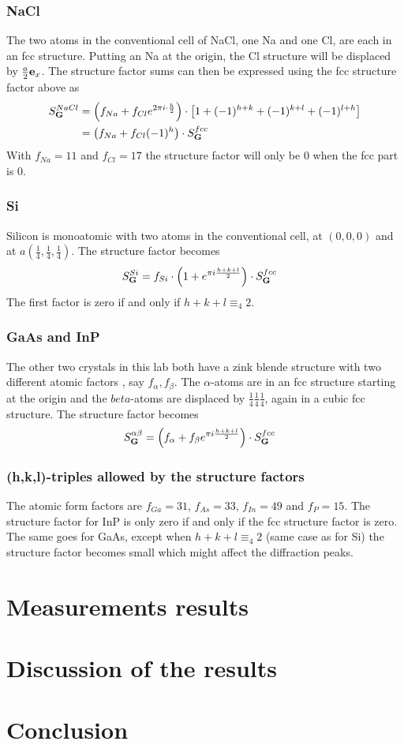 \documentclass[a4paper,twoside=false,abstract=false,numbers=noenddot,
titlepage=false,headings=small,parskip=half,version=last]{scrartcl}
\begin{document}
\subsubsection{NaCl}
The two atoms in the conventional cell of NaCl, one Na and one Cl, are each in an fcc structure. Putting an Na at the origin, the Cl structure will be displaced by $\frac{a}{2}\bold{e}_x$. The structure factor sums can then be expressed using the fcc structure factor above as
\begin{align}
S^{NaCl}_{\bold{G}} &= \left( f_{Na} + f_{Cl}e^{2\pi i\cdot \frac{h}{2}} \right) \cdot \left[ 1 + (-1)^{h+k} + (-1)^{k+l} + (-1)^{l+h}\right]\nonumber\\
&= \left( f_{Na} + f_{Cl}(-1)^{h} \right) \cdot S^{fcc}_{\bold{G}}
\end{align}\label{naclstructure}
With $f_{Na}=11$ and $f_{Cl}=17$ the structure factor will only be $0$ when the fcc part is $0$.
\subsubsection{Si}
Silicon is monoatomic with two atoms in the conventional cell, at $(0,0,0)$ and at $a(\frac{1}{4},\frac{1}{4},\frac{1}{4})$. The structure factor becomes
\begin{align}
S^{Si}_{\bold{G}} &= f_{Si}\cdot \left( 1 + e^{\pi i \frac{h+k+l}{2}} \right) \cdot S^{fcc}_{\bold{G}}\label{sistructure}
\end{align}
The first factor is zero if and only if $h+k+l\equiv_4 2$.

\subsubsection{GaAs and InP}
The other two crystals in this lab both have a zink blende structure with two different atomic factors , say $f_\alpha,f_\beta$. The $\alpha$-atoms are in an fcc structure starting at the origin and the $beta$-atoms are displaced by $\frac{1}{4}\frac{1}{4}\frac{1}{4}$, again in a cubic fcc structure. The structure factor becomes
\begin{align}
S^{\alpha\beta}_{\bold{G}} &= \left( f_\alpha + f_\beta e^{\pi i \frac{h+k+l}{2}} \right) \cdot S^{fcc}_{\bold{G}}\label{zincblendestructure}
\end{align}
\subsubsection{(h,k,l)-triples allowed by the structure factors}
The atomic form factors are $f_{Ga}=31$, $f_{As}=33$, $f_{In}=49$ and $f_{P}=15$. The structure factor for InP is only zero if and only if the fcc structure factor is zero. The same goes for GaAs, except when $h+k+l\equiv_4 2$ (same case as for Si) the structure factor becomes small which might affect the diffraction peaks.
\section{Measurements results}

\section{Discussion of the results}

\section{Conclusion}
\end{document}
